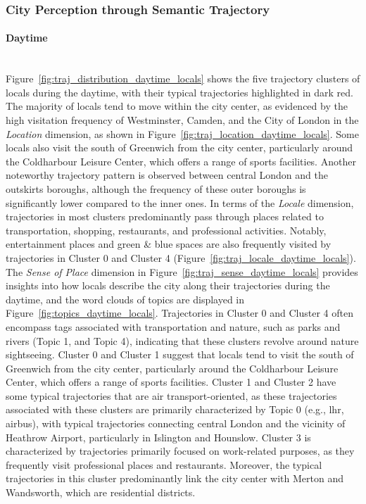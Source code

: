\documentclass{article}
\newcommand{\subsubsubsection}[1]{\paragraph{#1}\mbox{}\\}
\theoremstyle{remark}
\begin{document}
\subsubsection{City Perception through Semantic Trajectory} \label{perception_through_traj}

\subsubsubsection{Daytime}

Figure~\ref{fig:traj_distribution_daytime_locals} shows the five trajectory clusters of locals during the daytime, with their typical trajectories highlighted in dark red. The majority of locals tend to move within the city center, as evidenced by the high visitation frequency of Westminster, Camden, and the City of London in the \textit{Location} dimension, as shown in Figure~\ref{fig:traj_location_daytime_locals}. Some locals also visit the south of Greenwich from the city center, particularly around the Coldharbour Leisure Center, which offers a range of sports facilities. Another noteworthy trajectory pattern is observed between central London and the outskirts boroughs, although the frequency of these outer boroughs is significantly lower compared to the inner ones. In terms of the \textit{Locale} dimension, trajectories in most clusters predominantly pass through places related to transportation, shopping, restaurants, and professional activities. Notably, entertainment places and green \& blue spaces are also frequently visited by trajectories in Cluster 0 and Cluster 4 (Figure~\ref{fig:traj_locale_daytime_locals}). The \textit{Sense of Place} dimension in Figure~\ref{fig:traj_sense_daytime_locals} provides insights into how locals describe the city along their trajectories during the daytime, and the word clouds of topics are displayed in Figure~\ref{fig:topics_daytime_locals}. Trajectories in Cluster 0 and Cluster 4 often encompass tags associated with transportation and nature, such as parks and rivers (Topic 1, and Topic 4), indicating that these clusters revolve around nature sightseeing. Cluster 0 and Cluster 1 suggest that locals tend to visit the south of Greenwich from the city center, particularly around the Coldharbour Leisure Center, which offers a range of sports facilities. Cluster 1 and Cluster 2 have some typical trajectories that are air transport-oriented, as these trajectories associated with these clusters are primarily characterized by Topic 0 (e.g., lhr, airbus), with typical trajectories connecting central London and the vicinity of Heathrow Airport, particularly in Islington and Hounslow. Cluster 3 is characterized by trajectories primarily focused on work-related purposes, as they frequently visit professional places and restaurants. Moreover, the typical trajectories in this cluster predominantly link the city center with Merton and Wandsworth, which are residential districts.
\end{document}
